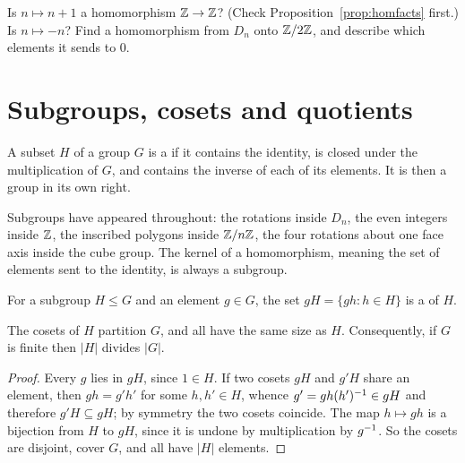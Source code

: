 \begin{tryit}
Is $n\mapsto n+1$ a homomorphism $\mathbb{Z}\to\mathbb{Z}$? (Check Proposition~\ref{prop:homfacts} first.) Is
$n\mapsto -n$? Find a homomorphism from $D_n$ onto $\mathbb{Z}/2\mathbb{Z}$, and describe which elements it sends to
$0$.
\end{tryit}

\section{Subgroups, cosets and quotients}\label{sec:quot}

\begin{defi}
A subset $H$ of a group $G$ is a  if it contains the identity, is closed under the
multiplication of $G$, and contains the inverse of each of its elements. It is then a group in its
own right.
\end{defi}

Subgroups have appeared throughout: the rotations inside $D_n$, the even integers inside $\mathbb{Z}$, the
inscribed polygons inside $\mathbb{Z}/n\mathbb{Z}$, the four rotations about one face axis inside the cube group.
The kernel of a homomorphism, meaning the set of elements sent to the identity, is always a
subgroup.

\begin{defi}
For a subgroup $H\le G$ and an element $g\in G$, the set $gH=\{gh: h\in H\}$ is a 
of $H$.
\end{defi}


\begin{prop}
The cosets of $H$ partition $G$, and all have the same size as $H$. Consequently, if $G$ is finite
then $|H|$ divides $|G|$.
\end{prop}

\begin{proof}
Every $g$ lies in $gH$, since $1\in H$. If two cosets $gH$ and $g'H$ share an element, then
$gh=g'h'$ for some $h,h'\in H$, whence $g'=gh(h')^{-1}\in gH$ and therefore $g'H\subseteq gH$; by
symmetry the two cosets coincide. The map $h\mapsto gh$ is a bijection from $H$ to $gH$, since it is
undone by multiplication by $g^{-1}$. So the cosets are disjoint, cover $G$, and all have $|H|$
elements.
\end{proof}

